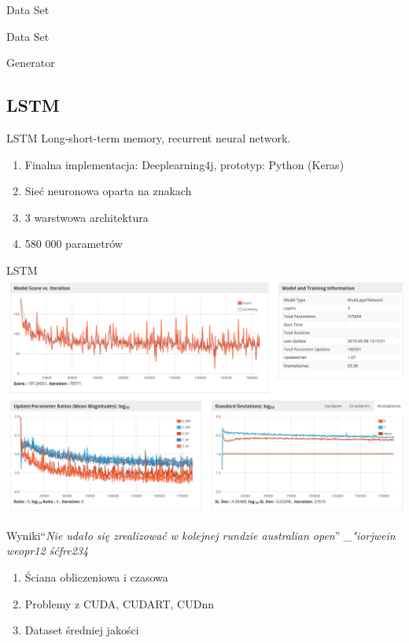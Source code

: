 \documentclass[14pt]{beamer}
\newcommand{\fakehead}[1]{``\textit{#1}''}
\begin{document}
\begin{section}{Data Set}
	\begin{frame}{Data Set}
	\end{frame}
\end{section}

\begin{section}{Generator}
	\subsection{LSTM}

	\begin{frame}{LSTM}
		Long-short-term memory, recurrent neural network.
		\begin{enumerate}
			\item Finalna implementacja: Deeplearning4j, prototyp: Python (Keras)
			\item Sieć neuronowa oparta na znakach
			\item 3 warstwowa architektura
			\item 580 000 parametrów
		\end{enumerate}
	\end{frame}
	\begin{frame}[fragile]{LSTM}
		\includegraphics[width=\linewidth]{lstm.png}
	\end{frame}
	\begin{frame}{Wyniki}{\fakehead{Nie udało się zrealizować w kolejnej rundzie australian open}}
			{\textit{\_"iorjwein weopr12 śćfre234}}
		\begin{enumerate}
			\item Ściana obliczeniowa i czasowa
			\item Problemy z CUDA, CUDART, CUDnn
			\item Dataset średniej jakości
		\end{enumerate}
	\end{frame}

\end{section}
\end{document}
